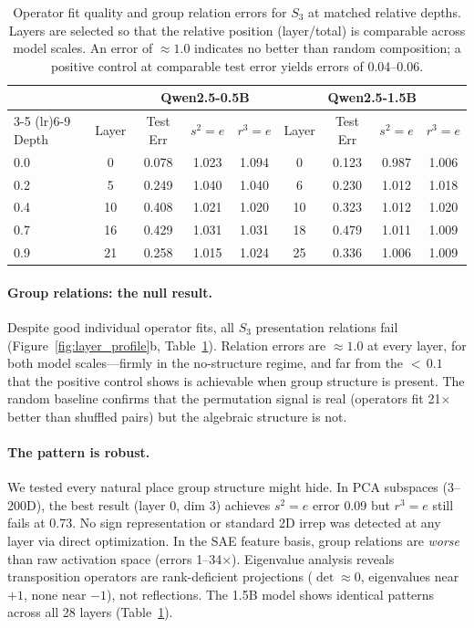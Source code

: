\documentclass[10pt, letterpaper]{article}
\begin{document}
\begin{table}[t]
\centering
\caption{Operator fit quality and group relation errors for $S_3$ at matched relative depths. Layers are selected so that the relative position (layer/total) is comparable across model scales. An error of $\approx 1.0$ indicates no better than random composition; a positive control at comparable test error yields errors of 0.04--0.06.}
\label{tab:alignment}
\small
\begin{tabular}{@{}lcccccccc@{}}
\toprule
& & \multicolumn{3}{c}{Qwen2.5-0.5B} & \multicolumn{4}{c}{Qwen2.5-1.5B} \\
\cmidrule(lr){3-5} \cmidrule(lr){6-9}
Depth & Layer & Test Err & $s^2\!=\!e$ & $r^3\!=\!e$ & Layer & Test Err & $s^2\!=\!e$ & $r^3\!=\!e$ \\
\midrule
0.0  & 0  & 0.078 & 1.023 & 1.094 & 0  & 0.123 & 0.987 & 1.006 \\
0.2  & 5  & 0.249 & 1.040 & 1.040 & 6  & 0.230 & 1.012 & 1.018 \\
0.4  & 10 & 0.408 & 1.021 & 1.020 & 10 & 0.323 & 1.012 & 1.020 \\
0.7  & 16 & 0.429 & 1.031 & 1.031 & 18 & 0.479 & 1.011 & 1.009 \\
0.9  & 21 & 0.258 & 1.015 & 1.024 & 25 & 0.336 & 1.006 & 1.009 \\
\bottomrule
\end{tabular}
\end{table}

\paragraph{Group relations: the null result.} Despite good individual operator fits, all $S_3$ presentation relations fail (Figure~\ref{fig:layer_profile}b, Table~\ref{tab:alignment}). Relation errors are $\approx 1.0$ at every layer, for both model scales---firmly in the no-structure regime, and far from the ${<}\,0.1$ that the positive control shows is achievable when group structure is present. The random baseline confirms that the permutation signal is real (operators fit 21$\times$ better than shuffled pairs) but the algebraic structure is not.

\paragraph{The pattern is robust.} We tested every natural place group structure might hide. In PCA subspaces (3--200D), the best result (layer 0, dim 3) achieves $s^2 = e$ error 0.09 but $r^3 = e$ still fails at 0.73. No sign representation or standard 2D irrep was detected at any layer via direct optimization. In the SAE feature basis, group relations are \emph{worse} than raw activation space (errors 1--34$\times$). Eigenvalue analysis reveals transposition operators are rank-deficient projections ($\det \approx 0$, eigenvalues near $+1$, none near $-1$), not reflections. The 1.5B model shows identical patterns across all 28 layers (Table~\ref{tab:alignment}).
\end{document}
